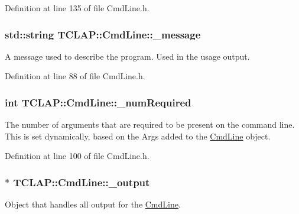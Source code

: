 Definition at line 135 of file Cmd\+Line.\+h.

\hypertarget{class_t_c_l_a_p_1_1_cmd_line_a3ccd2ae40f6eb97aebca3de9a02f10cf}{}
\subsubsection[{\+\_\+message}]{\setlength{\rightskip}{0pt plus 5cm}std\+::string T\+C\+L\+A\+P\+::\+Cmd\+Line\+::\+\_\+message\hspace{0.3cm}{\ttfamily [protected]}}\label{class_t_c_l_a_p_1_1_cmd_line_a3ccd2ae40f6eb97aebca3de9a02f10cf}
A message used to describe the program. Used in the usage output. 

Definition at line 88 of file Cmd\+Line.\+h.

\hypertarget{class_t_c_l_a_p_1_1_cmd_line_a2285207b528d5fad18c82a2ee8155f37}{}
\subsubsection[{\+\_\+num\+Required}]{\setlength{\rightskip}{0pt plus 5cm}int T\+C\+L\+A\+P\+::\+Cmd\+Line\+::\+\_\+num\+Required\hspace{0.3cm}{\ttfamily [protected]}}\label{class_t_c_l_a_p_1_1_cmd_line_a2285207b528d5fad18c82a2ee8155f37}
The number of arguments that are required to be present on the command line. This is set dynamically, based on the Args added to the \hyperlink{class_t_c_l_a_p_1_1_cmd_line}{Cmd\+Line} object. 

Definition at line 100 of file Cmd\+Line.\+h.

\hypertarget{class_t_c_l_a_p_1_1_cmd_line_a5152bf4ef26217583a3bc708aa0ea83e}{}
\subsubsection[{\+\_\+output}]{$\ast$ T\+C\+L\+A\+P\+::\+Cmd\+Line\+::\+\_\+output\hspace{0.3cm}{\ttfamily [protected]}}\label{class_t_c_l_a_p_1_1_cmd_line_a5152bf4ef26217583a3bc708aa0ea83e}
Object that handles all output for the \hyperlink{class_t_c_l_a_p_1_1_cmd_line}{Cmd\+Line}. 


